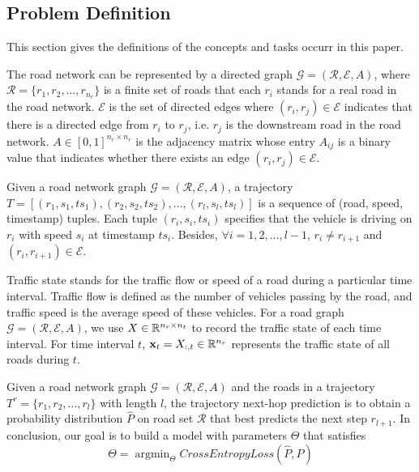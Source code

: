 \subsection{Problem Definition}
This section gives the definitions\cite{AAAI21} of the concepts and tasks occurr in this paper.
\begin{definition}
    The road network can be represented by a directed graph $\mathcal{G}=(\mathcal{R}, \mathcal{E}, A)$, where $\mathcal{R}=\{r_1, r_2, \dots, r_{n_r}\}$ is a finite set of roads that each $r_i$ stands for a real road in the road network. $\mathcal{E}$ is the set of directed edges where $(r_i, r_j)\in \mathcal{E}$ indicates that there is a directed edge from $r_i$ to $r_j$, i.e. $r_j$ is the downstream road in the road network. $A \in [0, 1]^{n_r\times n_r}$ is the adjacency matrix whose entry $A_{ij}$ is a binary value that indicates whether there exists an edge $(r_i, r_j)\in\mathcal{E}$.
\end{definition}

\begin{definition}[Trajectory]
    Given a road network graph $\mathcal{G}=(\mathcal{R}, \mathcal{E}, A)$, a trajectory $T=[(r_1, s_1, ts_1), (r_2, s_2, ts_2), \dots, (r_l, s_l, ts_l)]$ is a sequence of (road, speed, timestamp) tuples. Each tuple $(r_i, s_i, ts_i)$ specifies that the vehicle is driving on $r_i$ with speed $s_i$ at timestamp $ts_i$. Besides, $\forall i=1, 2, \dots, l-1$, $r_i\neq r_{i+1}$ and $(r_i, r_{i+1})\in\mathcal{E}$.
\end{definition}

\begin{definition}
    Traffic state stands for the traffic flow or speed of a road during a particular time interval. Traffic flow is defined as the number of vehicles passing by the road, and traffic speed is the average speed of these vehicles. For a road graph $\mathcal{G}=(\mathcal{R}, \mathcal{E}, A)$, we use $X\in\mathbb{R}^{n_r\times n_t}$ to record the traffic state of each time interval. For time interval $t$, $\mathbf{x}_t=X_{:, t}\in\mathbb{R}^{n_r}$ represents the traffic state of all roads during $t$.
\end{definition}

\begin{problem}
    Given a road network graph $\mathcal{G}=(\mathcal{R}, \mathcal{E}, A)$ and the roads in a trajectory $T^r=\{r_1, r_2, \dots, r_l \}$ with length $l$, the trajectory next-hop prediction is to obtain a probability distribution $\hat P$ on road set $\mathcal{R}$ that best predicts the next step $r_{l+1}$. In conclusion, our goal is to build a model with parameters $\Theta$ that satisfies
    \begin{equation}
        \Theta=\mathop{\arg\min}_\Theta CrossEntropyLoss(\hat P, P)
    \end{equation}
\end{problem}

